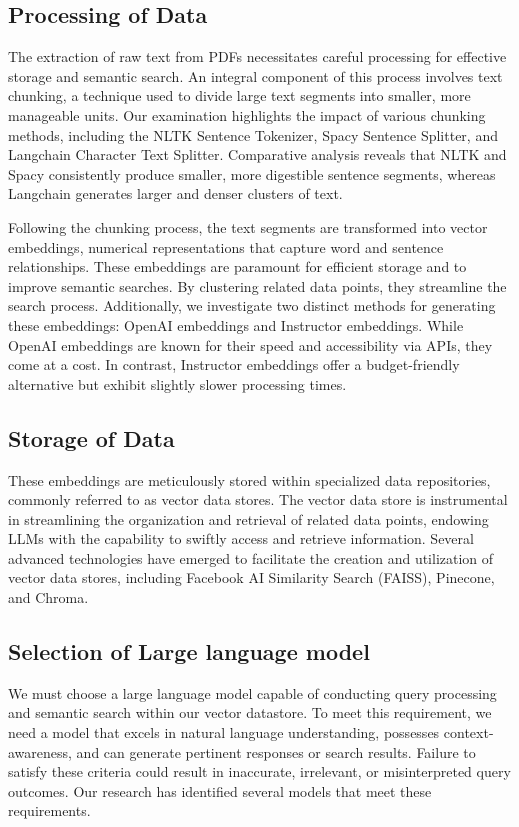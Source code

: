 \documentclass[fleqn,10pt]{thescipub} %
\begin{document}
\subsection{Processing of Data}

The extraction of raw text from PDFs necessitates careful processing for effective storage and semantic search. An integral component of this process involves text chunking, a technique used to divide large text segments into smaller, more manageable units. Our examination highlights the impact of various chunking methods, including the NLTK Sentence Tokenizer, Spacy Sentence Splitter, and Langchain Character Text Splitter. Comparative analysis reveals that NLTK and Spacy consistently produce smaller, more digestible sentence segments, whereas Langchain generates larger and denser clusters of text.

Following the chunking process, the text segments are transformed into vector embeddings, numerical representations that capture word and sentence relationships. These embeddings are paramount for efficient storage and to improve semantic searches. By clustering related data points, they streamline the search process. Additionally, we investigate two distinct methods for generating these embeddings: OpenAI embeddings and Instructor embeddings. While OpenAI embeddings are known for their speed and accessibility via APIs, they come at a cost. In contrast, Instructor embeddings offer a budget-friendly alternative but exhibit slightly slower processing times.

\subsection{Storage of Data}

These embeddings are meticulously stored within specialized data repositories, commonly referred to as vector data stores. The vector data store is instrumental in streamlining the organization and retrieval of related data points, endowing LLMs with the capability to swiftly access and retrieve information. Several advanced technologies have emerged to facilitate the creation and utilization of vector data stores, including Facebook AI Similarity Search (FAISS), Pinecone, and Chroma. 

\subsection{Selection of Large language model}
We must choose a large language model capable of conducting query processing and semantic search within our vector datastore. To meet this requirement, we need a model that excels in natural language understanding, possesses context-awareness, and can generate pertinent responses or search results. Failure to satisfy these criteria could result in inaccurate, irrelevant, or misinterpreted query outcomes. Our research has identified several models that meet these requirements.
\end{document}
